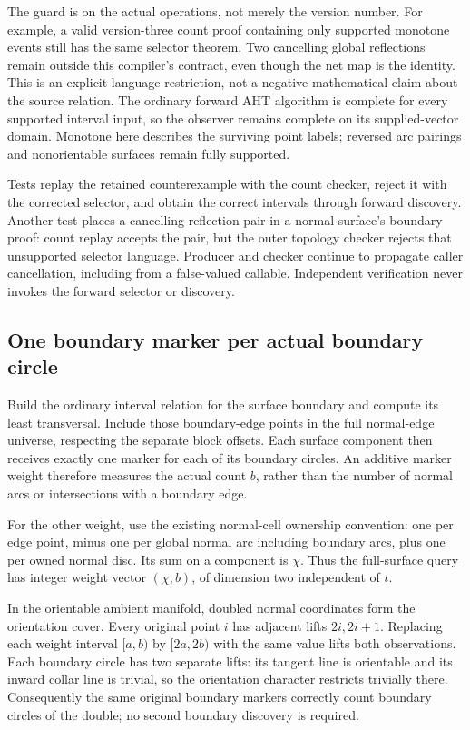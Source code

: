The guard is on the actual operations, not merely the version number.
For example, a valid version-three count proof containing only supported
monotone events still has the same selector theorem. Two cancelling global
reflections remain outside this compiler's contract, even though the net
map is the identity. This is an explicit language restriction, not a
negative mathematical claim about the source relation. The ordinary forward
AHT algorithm is complete for every supported interval input, so the observer
remains complete on its supplied-vector domain.
Monotone here describes the surviving point labels; reversed arc pairings
and nonorientable surfaces remain fully supported.

Tests replay the retained counterexample with the count checker, reject it
with the corrected selector, and obtain the correct intervals through forward
discovery. Another test places a cancelling reflection pair in a normal
surface's boundary proof: count replay accepts the pair, but the outer topology
checker rejects that unsupported selector language. Producer and checker
continue to propagate caller cancellation, including 
from a false-valued callable. Independent verification never invokes the
forward selector or discovery.

\subsection{One boundary marker per actual boundary circle}

Build the ordinary interval relation for the surface boundary and compute
its least transversal. Include those boundary-edge points in the full
normal-edge universe, respecting the separate block offsets. Each surface
component then receives exactly one marker for each of its boundary circles.
An additive marker weight therefore measures the actual count $b$, rather
than the number of normal arcs or intersections with a boundary edge.

For the other weight, use the existing normal-cell ownership convention:
one per edge point, minus one per global normal arc including boundary arcs,
plus one per owned
normal disc. Its sum on a component is $\chi$. Thus the full-surface query
has integer weight vector $(\chi,b)$, of dimension two independent of $t$.

In the orientable ambient manifold, doubled normal coordinates form the
orientation cover. Every original point $i$ has adjacent lifts $2i,2i+1$.
Replacing each weight interval $[a,b)$ by $[2a,2b)$ with the same value
lifts both observations. Each boundary circle has two separate lifts:
its tangent line is orientable and its inward collar line is trivial, so
the orientation character restricts trivially there. Consequently the same
original boundary markers correctly count boundary circles of the double;
no second boundary discovery is required.

